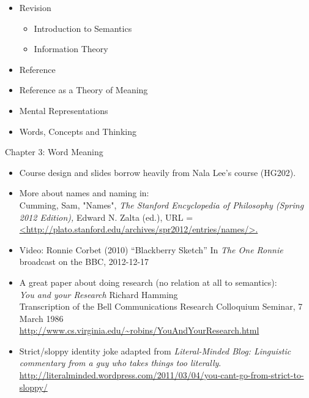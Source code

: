 \documentclass[headrule,footrule]{foils}
\begin{document}
\begin{itemize}
\item Revision
  \begin{itemize}
  \item Introduction to Semantics
  \item Information Theory
  \end{itemize}
\item Reference
\item Reference as a Theory of Meaning
\item Mental Representations
\item Words, Concepts and Thinking
\end{itemize}


 Chapter 3: Word Meaning


\MyLogo{}
\begin{itemize}
\item Course design and slides borrow heavily from Nala Lee's course (HG202).
\item More about names and naming in: \\
Cumming, Sam, "Names", \textit{The Stanford Encyclopedia of Philosophy (Spring 2012 Edition),} Edward N. Zalta (ed.), 
URL = \url{<http://plato.stanford.edu/archives/spr2012/entries/names/>.} 
\item Video: Ronnie Corbet (2010) ``Blackberry Sketch'' In \textit{The One Ronnie}
broadcast on the BBC, 2012-12-17 
\item A great paper about doing research (no relation at all to semantics):
\\
\textit{You and your Research}  Richard Hamming
\\ Transcription of the Bell Communications Research Colloquium Seminar, 7 March 1986 
\\ \url{http://www.cs.virginia.edu/~robins/YouAndYourResearch.html}
\item Strict/sloppy identity joke adapted from \textit{Literal-Minded Blog:
Linguistic commentary from a guy who takes things too literally}.
\\ \footnotesize\url{http://literalminded.wordpress.com/2011/03/04/you-cant-go-from-strict-to-sloppy/}


\end{itemize}

\small


\end{document}
